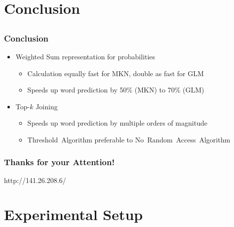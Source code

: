 \documentclass{presentation}
\begin{document}
\section*{Conclusion}
\subsection{}
\begin{frame}
  \frametitle{Conclusion}
  \begin{itemize}
    \large
    \item Weighted Sum representation for probabilities
      \begin{itemize}
        \vspace{0.2cm}
        \item Calculation equally fast for MKN, double as fast for GLM
        \vspace{0.2cm}
        \item Speeds up word prediction by 50\% (MKN) to 70\% (GLM)
      \end{itemize}

    \vspace{0.6cm}
    \item Top-$k$ Joining
      \begin{itemize}
        \vspace{0.2cm}
        \item Speeds up word prediction by multiple orders of magnitude
        \vspace{-0.2cm}
        \item Threshold~Algorithm preferable to No~Random~Access~Algorithm
      \end{itemize}
  \end{itemize}
\end{frame}

\begin{frame}[plain]
  \frametitle{Thanks for your Attention!}

  \begin{center}
    {http://}{\Huge141.26.208.6}{/}
  \end{center}
\end{frame}


\appendix
\section{Experimental Setup}
\end{document}
